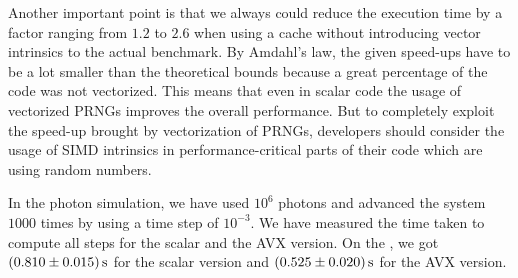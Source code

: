 \documentclass{stdlocal}
\begin{document}
    Another important point is that we always could reduce the execution time by a factor ranging from $1.2$ to $2.6$ when using a cache without introducing vector intrinsics to the actual benchmark.
    By Amdahl's law, the given speed-ups have to be a lot smaller than the theoretical bounds because a great percentage of the code was not vectorized.
    This means that even in scalar code the usage of vectorized PRNGs improves the overall performance.
    But to completely exploit the speed-up brought by vectorization of PRNGs, developers should consider the usage of SIMD intrinsics in performance-critical parts of their code which are using random numbers.

    In the photon simulation, we have used $10^6$ photons and advanced the system $1000$ times by using a time step of $10^{-3}$.
    We have measured the time taken to compute all steps for the scalar and the AVX version.
    On the , we got $(0.810\pm 0.015)\, \mathrm{s}$ for the scalar version and $(0.525 \pm 0.020)\, \mathrm{s}$ for the AVX version.
\end{document}
